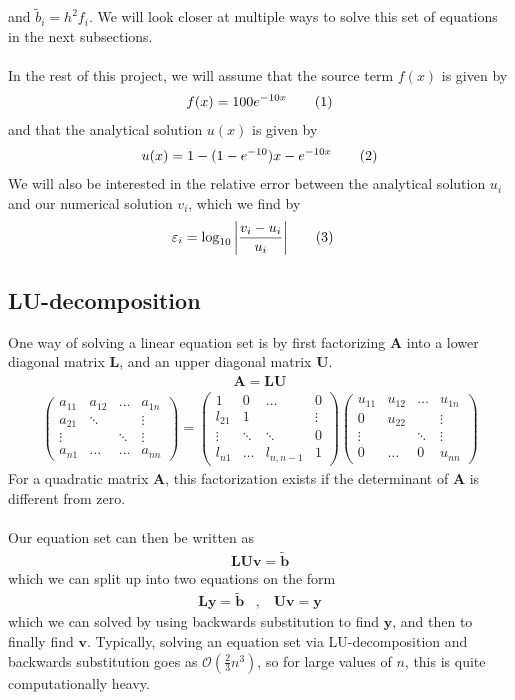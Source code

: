 \documentclass{article}
\newcommand\numberthis{\addtocounter{equation}{1}\tag{\theequation}}
\newcommand\ppmat[1]{\begin{pmatrix}#1\end{pmatrix}}
\begin{document}
and $\tilde b_i = h^2f_i$. We will look closer at multiple ways to solve this set of equations in the next subsections.\\\\
In the rest of this project, we will assume that the source term $f(x)$ is given by
\begin{align*}
f(x) = 100e^{-10x} \numberthis\label{eq:source_term}
\end{align*}
and that the analytical solution $u(x)$ is given by
\begin{align*}
  u(x) = 1-(1-e^{-10})x-e^{-10x} \numberthis\label{eq:analytical_solution}
\end{align*}
We will also be interested in the relative error between the analytical solution $u_i$ and our numerical solution $v_i$, which we find by
\begin{align*}
  \varepsilon_i &= \log_{10}\bigg|\frac{v_i-u_i}{u_i}\bigg| \numberthis\label{eq:rel_error}
\end{align*}
\subsection{LU-decomposition}
One way of solving a linear equation set is by first factorizing $\mathbf{A}$ into a lower diagonal matrix $\mathbf{L}$, and an upper diagonal matrix $\mathbf{U}$. 
\begin{align*}
  \mathbf{A} = \mathbf{L}\mathbf{U}
\end{align*}
\begin{align*}
  \ppmat{a_{11}&a_{12}&\dots&a_{1n}\\a_{21}&\ddots& &\vdots\\\vdots& &\ddots&\vdots\\a_{n1}&\dots&\dots&a_{nn}} = 
  \ppmat{1&0&\dots&0\\l_{21}&1& &\vdots\\\vdots&\ddots&\ddots&0\\l_{n1}&\dots&l_{n,n-1}&1}
  \ppmat{u_{11}&u_{12}&\dots&u_{1n}\\0&u_{22}& &\vdots\\\vdots& &\ddots&\vdots\\0&\dots&0&u_{nn}}
\end{align*}
For a quadratic matrix $\mathbf{A}$, this factorization exists if the determinant of $\mathbf{A}$ is different from zero.\\\\
Our equation set can then be written as
\begin{align*}
  \mathbf{L}\mathbf{U}\mathbf{v} = \mathbf{\tilde b}
\end{align*}
which we can split up into two equations on the form
\begin{align*}
  \mathbf{L}\mathbf{y} = \mathbf{\tilde b}\;\;\;,\;\;\;\mathbf{U}\mathbf{v} =\mathbf{y}
\end{align*}
which we can solved by using backwards substitution to find $\mathbf{y}$, and then to finally find $\mathbf{v}$. Typically, solving an equation set via LU-decomposition and backwards substitution goes as $\mathcal{O}(\tfrac{2}{3}n^3)$, so for large values of $n$, this is quite computationally heavy.
\end{document}

